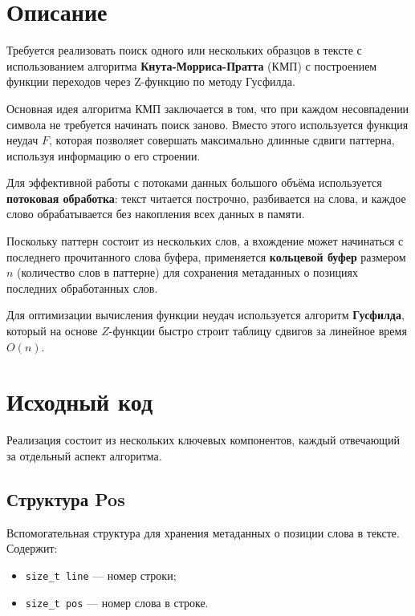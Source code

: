 \section{Описание}

Требуется реализовать поиск одного или нескольких образцов в тексте с использованием алгоритма \textbf{Кнута-Морриса-Пратта} (КМП) с построением функции переходов через Z-функцию по методу Гусфилда.

Основная идея алгоритма КМП заключается в том, что при каждом несовпадении символа не требуется начинать поиск заново. Вместо этого используется функция неудач $F$, которая позволяет совершать максимально длинные сдвиги паттерна, используя информацию о его строении.

Для эффективной работы с потоками данных большого объёма используется \textbf{потоковая обработка}: текст читается построчно, разбивается на слова, и каждое слово обрабатывается без накопления всех данных в памяти.

Поскольку паттерн состоит из нескольких слов, а вхождение может начинаться с последнего прочитанного слова буфера, применяется \textbf{кольцевой буфер} размером $n$ (количество слов в паттерне) для сохранения метаданных о позициях последних обработанных слов.

Для оптимизации вычисления функции неудач используется алгоритм \textbf{Гусфилда}, который на основе $Z$-функции быстро строит таблицу сдвигов за линейное время $O(n)$.

\pagebreak

\section{Исходный код}

Реализация состоит из нескольких ключевых компонентов, каждый отвечающий за отдельный аспект алгоритма.

\subsection{Структура Pos}

Вспомогательная структура для хранения метаданных о позиции слова в тексте. Содержит:
\begin{itemize}
    \item \texttt{size\_t line} — номер строки;
    \item \texttt{size\_t pos} — номер слова в строке.
\end{itemize}

